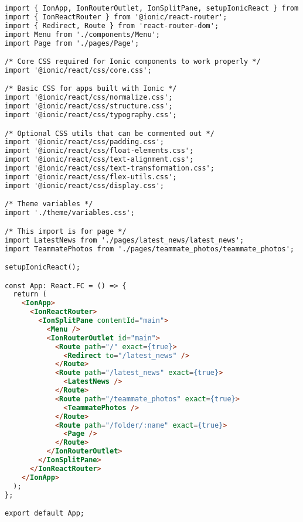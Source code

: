 \begin{lstlisting}[language=HTML, caption=App.tsx]
import { IonApp, IonRouterOutlet, IonSplitPane, setupIonicReact } from '@ionic/react';
import { IonReactRouter } from '@ionic/react-router';
import { Redirect, Route } from 'react-router-dom';
import Menu from './components/Menu';
import Page from './pages/Page';

/* Core CSS required for Ionic components to work properly */
import '@ionic/react/css/core.css';

/* Basic CSS for apps built with Ionic */
import '@ionic/react/css/normalize.css';
import '@ionic/react/css/structure.css';
import '@ionic/react/css/typography.css';

/* Optional CSS utils that can be commented out */
import '@ionic/react/css/padding.css';
import '@ionic/react/css/float-elements.css';
import '@ionic/react/css/text-alignment.css';
import '@ionic/react/css/text-transformation.css';
import '@ionic/react/css/flex-utils.css';
import '@ionic/react/css/display.css';

/* Theme variables */
import './theme/variables.css';

/* This import is for page */
import LatestNews from './pages/latest_news/latest_news';
import TeammatePhotos from './pages/teammate_photos/teammate_photos';

setupIonicReact();

const App: React.FC = () => {
  return (
    <IonApp>
      <IonReactRouter>
        <IonSplitPane contentId="main">
          <Menu />
          <IonRouterOutlet id="main">
            <Route path="/" exact={true}>
              <Redirect to="/latest_news" />
            </Route>
            <Route path="/latest_news" exact={true}>
              <LatestNews />
            </Route>
            <Route path="/teammate_photos" exact={true}>
              <TeammatePhotos />
            </Route>
            <Route path="/folder/:name" exact={true}>
              <Page />
            </Route>
          </IonRouterOutlet>
        </IonSplitPane>
      </IonReactRouter>
    </IonApp>
  );
};

export default App;
\end{lstlisting}

